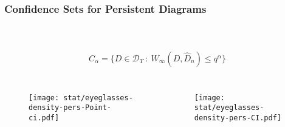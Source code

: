 \begin{frame}
 \frametitle{Confidence Sets for Persistent Diagrams}
 \framesubtitle{~}
 \begin{block}{}
  $$C_{\alpha}
  = \{ D \in \mathcal{D}_T ~:~ W_{\infty}(D,\widehat{D}_n) \leq q^{\alpha} \}$$
 \end{block}

 \begin{columns}
     \begin{figure}
     \centering

 \texttt{[image: stat/eyeglasses-density-pers-Point-ci.pdf]}
     \end{figure}
   \pause
     \begin{figure}
     \centering

\texttt{[image: stat/eyeglasses-density-pers-CI.pdf]}
     \end{figure}
\end{columns}
\end{frame}




